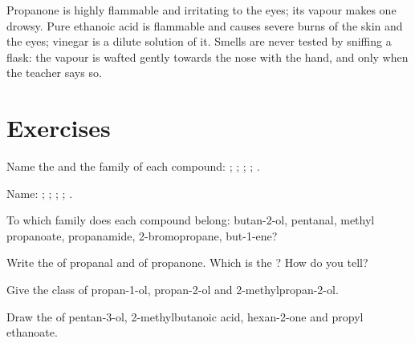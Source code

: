 \begin{safety}{}
Propanone is highly flammable and irritating to the eyes; its vapour
makes one drowsy. Pure ethanoic acid is flammable and causes severe
burns of the skin and the eyes; vinegar is a dilute solution of it.
Smells are never tested by sniffing a flask: the vapour is wafted
gently towards the nose with the hand, and only when the teacher says
so.
\end{safety}

\section{Exercises}


\begin{exercise}[$\star$]\label{exo:g11:functional-groups:1}
Name the  and the family of each compound:
; ; ;
; .
\end{exercise}

\begin{exercise}[$\star$]\label{exo:g11:functional-groups:2}
Name: ; ; ; ;
.
\end{exercise}

\begin{exercise}[$\star$]\label{exo:g11:functional-groups:3}
To which family does each compound belong: butan-2-ol, pentanal, methyl
propanoate, propanamide, 2-bromopropane, but-1-ene?
\end{exercise}

\begin{exercise}[$\star$]\label{exo:g11:functional-groups:4}
Write the  of propanal and of propanone. Which
is the ? How do you tell?
\end{exercise}

\begin{exercise}[$\star$]\label{exo:g11:functional-groups:5}
Give the class of propan-1-ol, propan-2-ol and 2-methylpropan-2-ol.
\end{exercise}

\begin{exercise}[$\star\star$]\label{exo:g11:functional-groups:6}
Draw the  of pentan-3-ol, 2-methylbutanoic acid,
hexan-2-one and propyl ethanoate.
\end{exercise}

